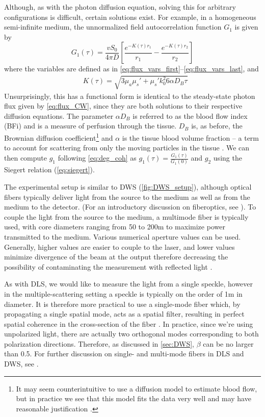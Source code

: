Although, as with the photon diffusion equation, solving this for arbitrary configurations is difficult, certain solutions exist. For example, in a homogeneous semi-infinite medium, the unnormalized field autocorrelation function $G_1$ is given by \cite{Durduran2010}
\begin{equation}\label{eq:g1_DCS_seminf}
G_1(\tau) = \frac{vS_0}{4\pi D}
\left[
    \frac{ e^{-K(\tau)r_1} }{ r_1 }
    -\frac{ e^{-K(\tau)r_2} }{ r_2 }
\right]
\end{equation}
where the variables are defined as in \autoref{eq:flux_vars_first}--\ref{eq:flux_vars_last}, and 
\begin{align}
&K(\tau) = \sqrt{3 \mu_a \mu_s' + \mu_s' k_0^2 6 \alpha D_B \tau}
\end{align}
Unsurprisingly, this has a functional form is identical to the steady-state photon flux given by \autoref{eq:flux_CW}, since they are both solutions to their respective diffusion equations. The parameter $\alpha D_B$ is referred to as the blood flow index (BFi) and is a measure of perfusion through the tissue. $D_B$ is, as before, the Brownian diffusion coefficient\footnote{It may seem counterintuitive to use a diffusion model to estimate blood flow, but in practice we see that this model fits the data very well \cite{Durduran2010} and may have reasonable justification \cite{Cheung2001}.} and $\alpha$ is the tissue blood volume fraction -- a term to account for scattering from only the moving particles in the tissue \cite{Cheung2001}. We can then compute $g_1$ following \autoref{eq:deg_coh} as $g_1(\tau) = \frac{G_1(\tau)}{G_1(0)}$ and $g_2$ using the Siegert relation (\autoref{eq:siegert}).  

The experimental setup is similar to DWS (\autoref{fig:DWS_setup}), although optical fibers typically deliver light from the source to the medium as well as from the medium to the detector. (For an introductory discussion on fiberoptics, see \cite[ch. 5.6]{Hecht2002}). To couple the light from the source to the medium, a multimode fiber is typically used, with core diameters ranging from 50 to 200\textmu m to maximize power transmitted to the medium. Various numerical aperture values can be used. Generally, higher values are easier to couple to the laser, and lower values minimize divergence of the beam at the output therefore decreasing the possibility of contaminating the measurement with reflected light \cite[ch. 6.2]{Boas1996thesis}.

As with DLS, we would like to measure the light from a single speckle, however in the multiple-scattering setting a speckle is typically on the order of 1\textmu m in diameter. It is therefore more practical to use a single-mode fiber which, by propagating a single spatial mode, acts as a spatial filter, resulting in perfect spatial coherence in the cross-section of the fiber \cite{Ricka1993}. In practice, since we're using unpolarized light, there are actually two orthogonal modes corresponding to both polarization directions. Therefore, as discussed in \autoref{sec:DWS}, $\beta$ can be no larger than 0.5. For further discussion on single- and multi-mode fibers in DLS and DWS, see \cite{VanKeuren1993, Ricka1993}.

